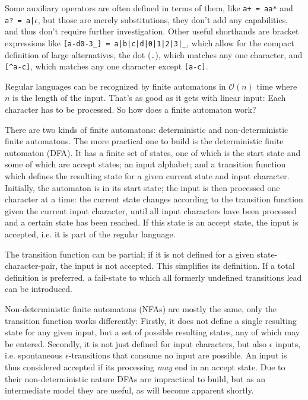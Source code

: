 			Some auxiliary operators are often defined in terms of them, like \lstinline$a+ = aa*$ and \lstinline$a? = a|$$\epsilon$, but those are merely substitutions, they don't add any capabilities, and thus don't require further investigation. Other useful shorthands are bracket expressions like \lstinline$[a-d0-3_] = a|b|c|d|0|1|2|3|_$, which allow for the compact definition of large alternatives, the dot (\lstinline$.$), which matches any one character, and \lstinline$[^a-c]$, which matches any one character except \lstinline$[a-c]$.
			
			Regular languages can be recognized by finite automatons in $\mathcal{O}(n)$ time where $n$ is the length of the input. That's as good as it gets with linear input: Each character has to be processed. So how does a finite automaton work?
			
			There are two kinds of finite automatons: deterministic and non-deterministic finite automatons. The more practical one to build is the deterministic finite automaton (DFA). It has a finite set of states, one of which is the start state and some of which are accept states; an input alphabet; and a transition function which defines the resulting state for a given current state and input character. Initially, the automaton is in its start state; the input is then processed one character at a time: the current state changes according to the transition function given the current input character, until all input characters have been processed and a certain state has been reached. If this state is an accept state, the input is accepted, i.e. it is part of the regular language.
			
			The transition function can be partial; if it is not defined for a given state-character-pair, the input is not accepted. This simplifies its definition. If a total definition is preferred, a fail-state to which all formerly undefined transitions lead can be introduced.
			
			Non-deterministic finite automatons (NFAs) are mostly the same, only the transition function works differently: Firstly, it does not define a single resulting state for any given input, but a set of possible resulting states, any of which may be entered. Secondly, it is not just defined for input characters, but also $\epsilon$ inputs, i.e. spontaneous $\epsilon$-transitions that consume no input are possible. An input is thus considered accepted if its processing \textit{may} end in an accept state. Due to their non-deterministic nature DFAs are impractical to build, but as an intermediate model they are useful, as will become apparent shortly.
			
